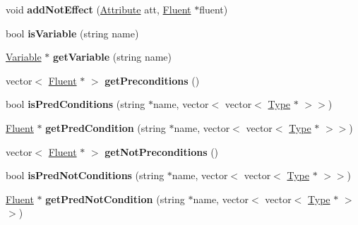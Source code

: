 \begin{DoxyCompactItemize}
\item 
\hypertarget{classDurativeAction_a9dffec2f6ba602dd4fdf0c73dd600f4b}{void {\bfseries add\+Not\+Effect} (\hyperlink{classAttribute}{Attribute} att, \hyperlink{classFluent}{Fluent} $\ast$fluent)}\label{classDurativeAction_a9dffec2f6ba602dd4fdf0c73dd600f4b}

\item 
\hypertarget{classDurativeAction_a706b2dcaebe118f693552e044f669317}{bool {\bfseries is\+Variable} (string name)}\label{classDurativeAction_a706b2dcaebe118f693552e044f669317}

\item 
\hypertarget{classDurativeAction_ab312dd7ef4e75f62e09dbbd2005898fc}{\hyperlink{classVariable}{Variable} $\ast$ {\bfseries get\+Variable} (string name)}\label{classDurativeAction_ab312dd7ef4e75f62e09dbbd2005898fc}

\item 
\hypertarget{classDurativeAction_a5eec26a104ce36d5f67c8ec96aeee371}{vector$<$ \hyperlink{classFluent}{Fluent} $\ast$ $>$ {\bfseries get\+Preconditions} ()}\label{classDurativeAction_a5eec26a104ce36d5f67c8ec96aeee371}

\item 
\hypertarget{classDurativeAction_ad29fec94dc012ef7d0c1389aac02e370}{bool {\bfseries is\+Pred\+Conditions} (string $\ast$name, vector$<$ vector$<$ \hyperlink{classType}{Type} $\ast$ $>$$>$)}\label{classDurativeAction_ad29fec94dc012ef7d0c1389aac02e370}

\item 
\hypertarget{classDurativeAction_aaff6af66a2be7343975d117dc93a263e}{\hyperlink{classFluent}{Fluent} $\ast$ {\bfseries get\+Pred\+Condition} (string $\ast$name, vector$<$ vector$<$ \hyperlink{classType}{Type} $\ast$ $>$$>$)}\label{classDurativeAction_aaff6af66a2be7343975d117dc93a263e}

\item 
\hypertarget{classDurativeAction_acc10d6f78ae097f35a5622c9f56183bf}{vector$<$ \hyperlink{classFluent}{Fluent} $\ast$ $>$ {\bfseries get\+Not\+Preconditions} ()}\label{classDurativeAction_acc10d6f78ae097f35a5622c9f56183bf}

\item 
\hypertarget{classDurativeAction_a71a81e7deb038e0fc14c57b9e7eb8afc}{bool {\bfseries is\+Pred\+Not\+Conditions} (string $\ast$name, vector$<$ vector$<$ \hyperlink{classType}{Type} $\ast$ $>$$>$)}\label{classDurativeAction_a71a81e7deb038e0fc14c57b9e7eb8afc}

\item 
\hypertarget{classDurativeAction_a13fcf0f4e025ec656a858a6f9f7a78a1}{\hyperlink{classFluent}{Fluent} $\ast$ {\bfseries get\+Pred\+Not\+Condition} (string $\ast$name, vector$<$ vector$<$ \hyperlink{classType}{Type} $\ast$ $>$$>$)}\label{classDurativeAction_a13fcf0f4e025ec656a858a6f9f7a78a1}


\end{DoxyCompactItemize}
